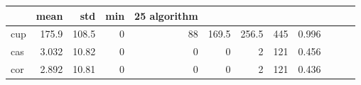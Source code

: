 \begin{tabular}{lrrrrrrrr}
\toprule
 & mean & std & min & 25%
algorithm &  &  &  &  &  &  &  &  \\
\midrule
cup & 175.9 & 108.5 & 0 & 88 & 169.5 & 256.5 & 445 & 0.996 \\
cas & 3.032 & 10.82 & 0 & 0 & 0 & 2 & 121 & 0.456 \\
cor & 2.892 & 10.81 & 0 & 0 & 0 & 2 & 121 & 0.436 \\
\bottomrule
\end{tabular}

